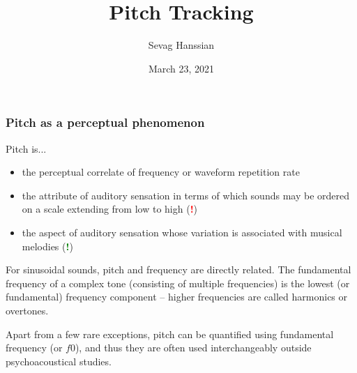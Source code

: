 \documentclass{beamer}
\title{Pitch Tracking}
\author{Sevag Hanssian}
\date{March 23, 2021}
\institute{MUMT 621, Winter 2021}
\begin{document}
\begin{frame}
\maketitle
\end{frame}

\begin{frame}
	\frametitle{Pitch as a perceptual phenomenon}
	Pitch is...
	\begin{itemize}
		\item
			the perceptual correlate of frequency or waveform repetition rate
		\item
			the attribute of auditory sensation in terms of which sounds may be ordered on a scale extending from low to high (\textcolor{red}{\textbf{!}})
		\item
			the aspect of auditory sensation whose variation is associated with musical melodies (\textcolor{green}{\textbf{!}})
	\end{itemize}
	For sinusoidal sounds, pitch and frequency are directly related. The fundamental frequency of a complex tone (consisting of multiple frequencies) is the lowest (or fundamental) frequency component -- higher frequencies are called harmonics or overtones.

	Apart from a few rare exceptions, pitch can be quantified using fundamental frequency (or $\mathit{f0}$), and thus they are often used interchangeably outside psychoacoustical studies.
\end{frame}

\end{document}
